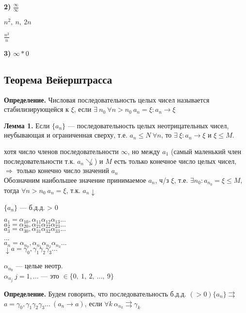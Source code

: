 \documentclass{article}
\begin{document}
    \textbf{2)} \( \frac{\infty}{\infty} \)

    \( n^2,\ n,\ 2n \)
    
    \( \frac{n^2}{n}  \) %

    \textbf{3)} \(\infty * 0\)
    
    \subsection{Теорема Вейерштрасса}

    \textbf{Определение.}
    Числовая последовательность целых чисел называется стабилизирующейся к \(\xi\), если \( \exists\ n_0\ \forall n > n_0\  a_n = \xi: a_n \rightarrow \xi \)
    
    \textbf{Лемма 1.}
    Если \(\{a_n\}\) --- последовательность целых неотрицательных чисел, неубывающая и ограниченная сверху, т.е. \( a_n \leq N\ \forall n\), то \( \exists\ \xi: a_n \rightarrow \xi \) и \( \xi \leq M \).

    хотя число членов последовательности \(\infty\), но между \(a_1\) (самый маленький член последовательности т.к. \( a_n \not\searrow \)) и \(M\) есть только конечное число целых чисел, \(\Rightarrow\) только конечно число значений \(a_n\)\\
    Обозначним наибольшее значение принимаемое \( a_n \), ч/з \( \xi \), т.е. \( \exists n_0: a_{n_0} = \xi \leq M \), тогда \( \forall n > n_0\ a_n = \xi \), т.к. \( a_n \downarrow \)
    
    \(\{a_n\}\) --- б.д.д. > 0
    
    \(a_1 = \alpha_{10},\alpha_{11}\alpha_{12}\alpha_{13}...\)\\
    \(a_2 = \alpha_{20},\alpha_{21}\alpha_{22}\alpha_{23}...\)\\
    \(a_3 = \alpha_{30},\alpha_{31}\alpha_{32}\alpha_{33}...\)\\
    ...\\
    \(a_n = \alpha_{n_0},\alpha_{n_1}\alpha_{n_2}\alpha_{n_3}...\)\\
    \(\downarrow a = \gamma_0,\gamma_1\gamma_2\gamma_3...\)

    \(\alpha_{n_0}\) --- целые неотр.\\
    \(\alpha_{n_j}\  j = 1, ...\) --- это \(\in \{0,\ 1,\ 2, \ ..., \ 9\}\)

    \textbf{Определение.} Будем говорить, что последовательность б.д.д. \( (>0) \{a_n\} \rightrightarrows \)\\
    \( a = \gamma_0,\gamma_1\gamma_2\gamma_3...\ (a_n \rightarrow a) \), если \(\forall k \ \alpha_{n_k} \rightrightarrows \gamma_k\)
\end{document}
